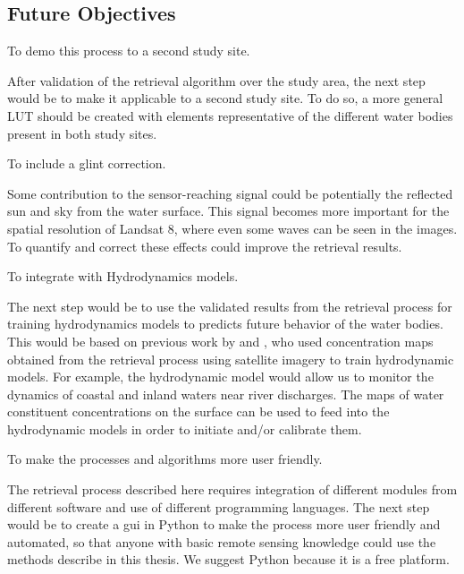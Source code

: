 \subsection{Future Objectives}
	\begin{enumerate}

			{\bf \item To demo this process to a second study site.}

After validation of the retrieval algorithm over the study area, the next step would be to make it applicable to a second study site. To do so, a more general LUT should be created with elements representative of the different water bodies present in both study sites.

			{\bf \item To include a glint correction.}

Some contribution to the sensor-reaching signal could be potentially the reflected sun and sky from the water surface. This signal becomes more important for the spatial resolution of Landsat 8, where even some waves can be seen in the images. To quantify and correct these effects could improve the retrieval results.

			{\bf \item To integrate with Hydrodynamics models.} 

The next step would be to use the validated results from the retrieval process for training hydrodynamics models to predicts future behavior of the water bodies. This would be based on previous work by \citet{Pahlevan:2012} and \citet{GeraceThesis}, who used concentration maps obtained from the retrieval process using satellite imagery to train hydrodynamic models. For example, the hydrodynamic model would allow us to monitor the dynamics of coastal and inland waters near river discharges. The maps of water constituent concentrations on the surface can be used to feed into the hydrodynamic models in order to initiate and/or calibrate them. 

			{\bf \item To make the processes and algorithms more user friendly.} 

The retrieval process described here requires integration of different modules from different software and use of different programming languages. The next step would be to create a \gls{gui} in Python to make the process more user friendly and automated, so that anyone with basic remote sensing knowledge could use the methods describe in this thesis. We suggest Python because it is a free platform.


\end{enumerate}
